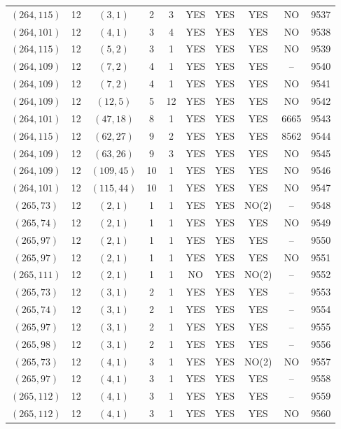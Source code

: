\begin{longtable}{|c|c|c|c|c|c|c|c|c|c|}
$(264, 115)$ & 12 & $(3, 1)$ & 2 & 3 & YES & YES & YES & NO & 9537\\
$(264, 101)$ & 12 & $(4, 1)$ & 3 & 4 & YES & YES & YES & NO & 9538\\
$(264, 115)$ & 12 & $(5, 2)$ & 3 & 1 & YES & YES & YES & NO & 9539\\
$(264, 109)$ & 12 & $(7, 2)$ & 4 & 1 & YES & YES & YES & -- & 9540\\
$(264, 109)$ & 12 & $(7, 2)$ & 4 & 1 & YES & YES & YES & NO & 9541\\
$(264, 109)$ & 12 & $(12, 5)$ & 5 & 12 & YES & YES & YES & NO & 9542\\
$(264, 101)$ & 12 & $(47, 18)$ & 8 & 1 & YES & YES & YES & 6665 & 9543\\
$(264, 115)$ & 12 & $(62, 27)$ & 9 & 2 & YES & YES & YES & 8562 & 9544\\
$(264, 109)$ & 12 & $(63, 26)$ & 9 & 3 & YES & YES & YES & NO & 9545\\
$(264, 109)$ & 12 & $(109, 45)$ & 10 & 1 & YES & YES & YES & NO & 9546\\
$(264, 101)$ & 12 & $(115, 44)$ & 10 & 1 & YES & YES & YES & NO & 9547\\
$(265, 73)$ & 12 & $(2, 1)$ & 1 & 1 & YES & YES & NO(2) & -- & 9548\\
$(265, 74)$ & 12 & $(2, 1)$ & 1 & 1 & YES & YES & YES & NO & 9549\\
$(265, 97)$ & 12 & $(2, 1)$ & 1 & 1 & YES & YES & YES & -- & 9550\\
$(265, 97)$ & 12 & $(2, 1)$ & 1 & 1 & YES & YES & YES & NO & 9551\\
$(265, 111)$ & 12 & $(2, 1)$ & 1 & 1 & NO & YES & NO(2) & -- & 9552\\
$(265, 73)$ & 12 & $(3, 1)$ & 2 & 1 & YES & YES & YES & -- & 9553\\
$(265, 74)$ & 12 & $(3, 1)$ & 2 & 1 & YES & YES & YES & -- & 9554\\
$(265, 97)$ & 12 & $(3, 1)$ & 2 & 1 & YES & YES & YES & -- & 9555\\
$(265, 98)$ & 12 & $(3, 1)$ & 2 & 1 & YES & YES & YES & -- & 9556\\
$(265, 73)$ & 12 & $(4, 1)$ & 3 & 1 & YES & YES & NO(2) & NO & 9557\\
$(265, 97)$ & 12 & $(4, 1)$ & 3 & 1 & YES & YES & YES & -- & 9558\\
$(265, 112)$ & 12 & $(4, 1)$ & 3 & 1 & YES & YES & YES & -- & 9559\\
$(265, 112)$ & 12 & $(4, 1)$ & 3 & 1 & YES & YES & YES & NO & 9560\\

\end{longtable}
